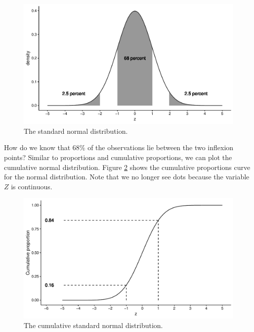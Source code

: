 \documentclass[]{book}\usepackage[]{graphicx}\usepackage[]{color}
\makeatletter
\def\maxwidth{ %
  \ifdim\Gin@nat@width>\linewidth
    \linewidth
  \else
    \Gin@nat@width
  \fi
}
\newenvironment{knitrout}{}{} %
\makeatother
\begin{document}
\begin{knitrout}
\color{fgcolor}\begin{figure}

{\centering \includegraphics[width=\maxwidth]{figure/normal_2-1} 

}

\caption[The standard normal distribution]{The standard normal distribution.}\label{fig:normal_2}
\end{figure}


\end{knitrout}

How do we know that 68\% of the observations lie between the two inflexion points? Similar to proportions and cumulative proportions, we can plot the cumulative normal distribution. Figure \ref{fig:normal_3} shows the cumulative proportions curve for the normal distribution. Note that we no longer see dots because the variable $Z$ is continuous.

\begin{knitrout}
\color{fgcolor}\begin{figure}

{\centering \includegraphics[width=\maxwidth]{figure/normal_3-1} 

}

\caption[The cumulative standard normal distribution]{The cumulative standard normal distribution.}\label{fig:normal_3}
\end{figure}


\end{knitrout}
\end{document}
